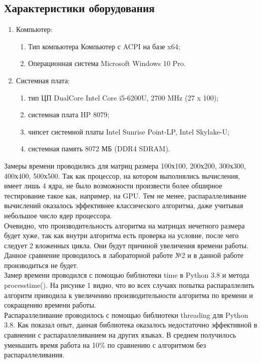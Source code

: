 \documentclass[../main.tex]{subfiles}
\begin{document}
	
	\subsection{Характеристики оборудования}
	\begin{enumerate}
		\label{enu:comp}
		\item Компьютер:
		\begin{enumerate}
			\item Тип компьютера   Компьютер с ACPI на базе x64;
			\item Операционная система   Microsoft Windows 10 Pro.
		\end{enumerate}
		\item Системная плата:
		\begin{enumerate}
			\item тип ЦП   DualCore Intel Core i5-6200U, 2700 MHz (27 x 100);
			\item системная плата   HP 8079;
			\item чипсет системной платы   Intel Sunrise Point-LP, Intel Skylake-U;
			\item системная память   8072 МБ (DDR4 SDRAM).
		\end{enumerate}
	\end{enumerate}
	
	Замеры времени проводились для матриц размера 100х100, 200х200, 300х300, 400х400, 500х500. 
	Так как процессор, на котором выполнялись вычисления, имеет лишь 4 ядра, не было возможности произвести более обширное тестирование такое как, например, на GPU. 
	Тем не менее, распараллеливание вычислений оказалось эффективнее классического алгоритма, даже учитывая небольшое число ядер процессора.\\
	
	Очевидно, что производительность алгоритма на матрицах нечетного размера будет хуже, так как внутри алгоритма есть проверка на условие, после чего следует 2 вложенных цикла. 
	Они будут причиной увеличения времени работы. 
	Данное сравнение проводилось в лабораторной работе №2 и в данной работе производиться не будет.\\
	
	Замер времени проводился с помощью библиотеки time в Python 3.8 и метода processtime(). 
	На рисунке 1 видно, что во всех случаях попытка распараллелить алгоритм приводила к увеличению производительности алгоритма по времени и сокращению времени работы. \\
	
	Распараллеливание проводилось с помощью библиотеки threading для Python 3.8. Как показал опыт, данная библиотека оказалось недостаточно эффективной в сравнении с распараллеливанием на других языках. В среднем получилось уменьшить время работа на 10\% по сравнению с алгоритмом без распараллеливания. \\
	
\end{document}
